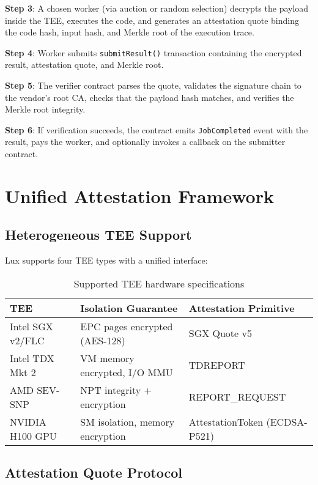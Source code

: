 \documentclass[11pt,letterpaper]{article}
\begin{document}
\textbf{Step 3}: A chosen worker (via auction or random selection) decrypts the payload inside the TEE, executes the code, and generates an attestation quote binding the code hash, input hash, and Merkle root of the execution trace.

\textbf{Step 4}: Worker submits \texttt{submitResult()} transaction containing the encrypted result, attestation quote, and Merkle root.

\textbf{Step 5}: The verifier contract parses the quote, validates the signature chain to the vendor's root CA, checks that the payload hash matches, and verifies the Merkle root integrity.

\textbf{Step 6}: If verification succeeds, the contract emits \texttt{JobCompleted} event with the result, pays the worker, and optionally invokes a callback on the submitter contract.

\section{Unified Attestation Framework}
\label{sec:attestation}

\subsection{Heterogeneous TEE Support}

Lux supports four TEE types with a unified interface:

\begin{table}[h]
\centering
\begin{tabular}{@{}lll@{}}
\toprule
\textbf{TEE} & \textbf{Isolation Guarantee} & \textbf{Attestation Primitive} \\
\midrule
Intel SGX v2/FLC & EPC pages encrypted (AES-128) & SGX Quote v5 \\
Intel TDX Mkt 2 & VM memory encrypted, I/O MMU & TDREPORT \\
AMD SEV-SNP & NPT integrity + encryption & REPORT\_REQUEST \\
NVIDIA H100 GPU & SM isolation, memory encryption & AttestationToken (ECDSA-P521) \\
\bottomrule
\end{tabular}
\caption{Supported TEE hardware specifications}
\label{tab:tees}
\end{table}

\subsection{Attestation Quote Protocol}
\end{document}
